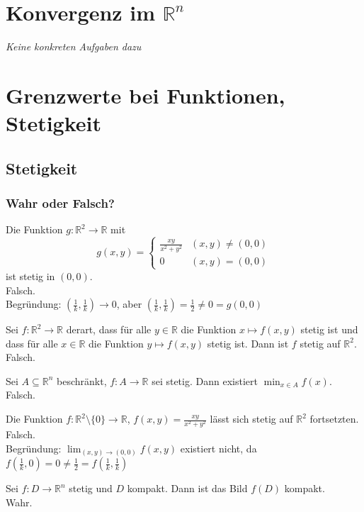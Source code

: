\section{Konvergenz im $\mathbb{R}^n$}
\textit{Keine konkreten Aufgaben dazu}

\section{Grenzwerte bei Funktionen, Stetigkeit}
\subsection{Stetigkeit}
\subsubsection{Wahr oder Falsch?}
Die Funktion $g : \mathbb{R}^2 \to \mathbb{R}$ mit
\begin{displaymath}
  g(x,y) =
  \begin{cases}
    \frac{xy}{x^2 + y^2}& (x,y) \neq (0,0)\\
    0& (x,y) = (0,0)
  \end{cases}
\end{displaymath}
ist stetig in $(0,0)$.\\
Falsch.\\
Begründung: $\left(\frac{1}{k}, \frac{1}{k}\right) \to 0$, aber $\left(\frac{1}{k}, \frac{1}{k}\right) = \frac{1}{2} \neq 0 = g(0,0)$

Sei $f: \mathbb{R}^2 \to \mathbb{R}$ derart, dass für alle $y \in \mathbb{R}$ die Funktion $x \mapsto f(x,y)$ stetig ist und dass für alle $x \in \mathbb{R}$ die Funktion $y \mapsto f(x,y)$ stetig ist.
Dann ist $f$ stetig auf $\mathbb{R}^2$.\\
Falsch.

Sei $A \subseteq \mathbb{R}^n$ beschränkt, $f : A \to \mathbb{R}$ sei stetig.
Dann existiert $\min_{x \in A} f(x)$.\\
Falsch.

Die Funktion $f : \mathbb{R}^2 \setminus \{0\} \to \mathbb{R}$, $f(x,y) = \frac{xy}{x^2 + y^2}$ lässt sich stetig auf $\mathbb{R}^2$ fortsetzten.\\
Falsch.\\
Begründung: $\lim_{(x,y) \to (0,0)} f(x,y)$ existiert nicht, da $f\left(\frac{1}{k}, 0\right) = 0 \neq \frac{1}{2} = f\left(\frac{1}{k}, \frac{1}{k}\right)$

Sei $f:D \to \mathbb{R}^n$ stetig und $D$ kompakt.
Dann ist das Bild $f(D)$ kompakt.\\
Wahr.